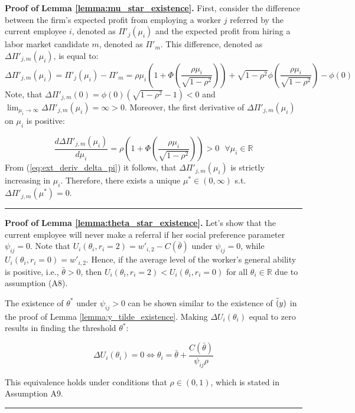 \documentclass[12pt]{article}
\newenvironment{proof}[1][Proof of]{\noindent\textbf{#1} }{\ \rule{0.5em}{0.5em}}
\begin{document}
\begin{proof}
    \textbf{Lemma \ref{lemma:mu_star_existence}.}
    First, consider the difference between the firm's expected profit from employing a worker $j$ referred by the current employee $i$, denoted as $\Pi'_j(\mu_i)$ and the expected profit from hiring a labor market candidate $m$, denoted as $\Pi'_m$. This difference, denoted as $\Delta\Pi'_{j,m}(\mu_i)$, is equal to:
\begin{equation*}
    \Delta\Pi'_{j,m}(\mu_i) = \Pi'_j(\mu_i) - \Pi'_m
    = \rho\mu_i \left(1+\Phi\left(\frac{\rho\mu_i}{\sqrt{1-\rho^2}}\right)\right) + \sqrt{1-\rho^2}\phi\left(\frac{\rho\mu_i}{\sqrt{1-\rho^2}}\right) - \phi(0)
\end{equation*}
Note, that $\Delta\Pi'_{j,m}(0) = \phi(0)(\sqrt{1-\rho^2}-1)<0$ and $\lim_{\mu_i \rightarrow \infty}{\Delta\Pi'_{j,m}(\mu_i) = \infty>0}$. Moreover, the first derivative of $\Delta\Pi'_{j,m}(\mu_i)$ on $\mu_i$ is positive:

\begin{equation}\label{eq:ext_deriv_delta_pi}
    \frac{d\Delta\Pi'_{j,m}(\mu_i)}{d\mu_i} = \rho\left( 1+ \Phi\left(\frac{\rho\mu_i}{\sqrt{1-\rho^2}}\right)\right) >0 \text{   } \forall \mu_i \in \mathbb{R}
\end{equation}
From (\ref{eq:ext_deriv_delta_pi}) it follows, that $\Delta\Pi'_{j,m}(\mu_i)$ is strictly increasing in $\mu_i$. Therefore, there exists a unique $\mu^* \in (0,\infty)$ s.t. $\Delta\Pi'_{j,m}(\mu^*) = 0$.
\end{proof}

\begin{proof}
    \textbf{Lemma \ref{lemma:theta_star_existence}.}
    Let's show that the current employee will never make a referral if her social preference parameter $\psi_{ij} = 0$. Note that $U_i(\theta_i, r_i = 2) = w'_{i,2}-C(\bar{\theta})$ under $\psi_{ij} = 0$, while $U_i(\theta_i, r_i = 0) = w'_{i,2}$. Hence, if the average level of the worker's general ability is positive, i.e., $\bar{\theta} >0$, then $U_i(\theta_i, r_i = 2) < U_i(\theta_i, r_i = 0)$ for all $\theta_i \in \mathbb{R}$ due to assumption (A8).

    The existence of $\theta^*$ under $\psi_{ij}>0$ can be shown similar to the existence of $\Tilde(y)$ in the proof of Lemma \ref{lemma:y_tilde_existence}. Making $\Delta U_i(\theta_i)$ equal to zero results in finding the threshold $\theta^*$:

    \begin{equation*}
        \Delta U_i(\theta_i) = 0 \Leftrightarrow \theta_i = \bar{\theta} + \frac{C(\bar{\theta})}{\psi_{ij}\rho}
    \end{equation*}

This equivalence holds under conditions that $\rho \in (0,1)$, which is stated in Assumption A9.
\end{proof}
\end{document}
